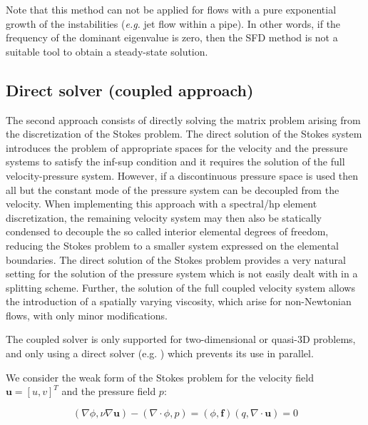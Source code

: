 Note that this method can not be applied for flows with a pure exponential growth of the instabilities (\textit{e.g.} jet flow within a pipe). In other words, if the frequency of the dominant eigenvalue is zero, then the SFD method is not a suitable tool to obtain a steady-state solution.


\subsection{Direct solver (coupled approach)}
\label{DirectSolv}
The second approach consists of directly solving the matrix problem
arising from the discretization of the Stokes problem.  The direct
solution of the Stokes system introduces the problem of appropriate
spaces for the velocity and the pressure systems to satisfy the
inf-sup condition and it requires the solution of the full
velocity-pressure system. However, if a discontinuous pressure space
is used then all but the constant mode of the pressure system can be
decoupled from the velocity. When implementing this
approach with a spectral/hp element discretization, the remaining
velocity system may then also be statically condensed to decouple the so
called interior elemental degrees of freedom, reducing the Stokes
problem to a smaller system expressed on the elemental boundaries. The
direct solution of the Stokes problem provides a very natural setting
for the solution of the pressure system which is not easily dealt with
in a splitting scheme. Further, the solution of the full coupled
velocity system allows the introduction of a spatially varying
viscosity, which arise for non-Newtonian flows, with only minor
modifications.

\begin{notebox}
  The coupled solver is only supported for two-dimensional or quasi-3D problems,
  and only using a direct solver (e.g. ) which prevents
  its use in parallel.
\end{notebox}

We consider the weak form of the Stokes problem for the velocity field
$\boldsymbol{u}=[u,v]^{T}$ and the pressure field $p$:

\begin{subequations}
\begin{equation}
 (\nabla \phi,\nu \nabla \boldsymbol{u}) - (\nabla\cdot\phi,p)=(\phi,\boldsymbol{f})
\end{equation}
\begin{equation}
 (q,\nabla \cdot \boldsymbol{u}) = 0
\end{equation}
\end{subequations}

